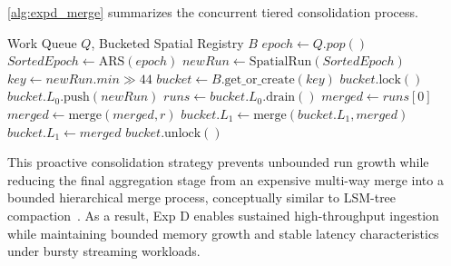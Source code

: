 \cref{alg:expd_merge} summarizes the concurrent tiered consolidation process.

\begin{algorithm}
\caption{Concurrent Tiered Spatial Consolidation}
\label{alg:expd_merge}
\begin{algorithmic}[1]
\REQUIRE Work Queue $Q$, Bucketed Spatial Registry $B$
\LOOP
 \STATE $epoch \gets Q.pop()$
 \STATE $SortedEpoch \gets \text{ARS}(epoch)$
 \STATE $newRun \gets \text{SpatialRun}(SortedEpoch)$
 \STATE $key \gets newRun.min \gg 44$
 \STATE $bucket \gets B.\text{get\_or\_create}(key)$
 \STATE $bucket.\text{lock}()$
 \STATE $bucket.L_0.\text{push}(newRun)$
 \STATE $runs \gets bucket.L_0.\text{drain}()$
 \STATE $merged \gets runs[0]$
 \STATE $merged \gets \text{merge}(merged, r)$
 \ENDFOR
 \STATE $bucket.L_1 \gets \text{merge}(bucket.L_1, merged)$
 \ELSE
 \STATE $bucket.L_1 \gets merged$
 \ENDIF
 \ENDIF
 \STATE $bucket.\text{unlock}()$
\ENDLOOP
\end{algorithmic}
\end{algorithm}

This proactive consolidation strategy prevents unbounded run growth while reducing the final aggregation stage from an expensive multi-way merge into a bounded hierarchical merge process, conceptually similar to LSM-tree compaction~\cite{oneilLogstructuredMergetreeLSMtree1996}.
As a result, Exp D enables sustained high-throughput ingestion while maintaining bounded memory growth and stable latency characteristics under bursty streaming workloads.
